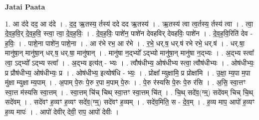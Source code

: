 \documentclass[17pt]{extarticle}
\begin{document}
\textbf{Jatai Paata} \newline

1. आ द॑दे दद॒ आ द॑दे । . द॒द॒ ऋ॒तस्य॒ र्तस्य॑ ददे दद ऋ॒तस्य॑ । . ऋ॒तस्य॑ त्वा त्व॒र्तस्य॒ र्तस्य॑ त्वा । . त्वा॒ दे॒व॒ह॒वि॒र् दे॒व॒ह॒वि॒ स्त्वा॒ त्वा॒ दे॒व॒ह॒विः॒ । . दे॒व॒ह॒विः॒ पाशे॑न॒ पाशे॑न देवहविर् देवहविः॒ पाशे॑न । . दे॒व॒ह॒वि॒रिति॑ देव - ह॒विः॒ । . पाशे॒ना पाशे॑न॒ पाशे॒ना । . आ र॑भे रभ॒ आ र॑भे । . र॒भे॒ धर्.ष॒ धर्.ष॑ रभे रभे॒ धर्.ष॑ । . धर्.षा॒ मानु॑षा॒न् मानु॑षा॒न् धर्.ष॒ धर्.षा॒ मानु॑षान् । . मानु॑षा न॒द्भ्यो᳚ ऽद्भ्यो मानु॑षा॒न् मानु॑षा न॒द्भ्यः । . अ॒द्भ्य स्त्वा᳚ त्वा॒ ऽद्भ्यो᳚ ऽद्भ्य स्त्वा᳚ । . अ॒द्भ्य इत्य॑त् - भ्यः । . त्वौष॑धीभ्य॒ ओष॑धीभ्य स्त्वा॒ त्वौष॑धीभ्यः । . ओष॑धीभ्यः॒ प्र प्रौष॑धीभ्य॒ ओष॑धीभ्यः॒ प्र । . ओष॑धीभ्य॒ इत्योष॑धि - भ्यः॒ । . प्रोक्षा᳚ म्युक्षामि॒ प्र प्रोक्षा॑मि । . उ॒क्षा॒ म्य॒पा म॒पा मु॑क्षा म्युक्षा म्य॒पाम् । . अ॒पाम् पे॒रुः पे॒रु र॒पा म॒पाम् पे॒रुः । . पे॒रु र॑स्यसि पे॒रुः पे॒रु र॑सि । . अ॒सि॒ स्वा॒त्तꣳ स्वा॒त्त म॑स्यसि स्वा॒त्तम् । . स्वा॒त्तम् चि॑च् चिथ् स्वा॒त्तꣳ स्वा॒त्तम् चि॑त् । . चि॒थ् सदे॑व॒(ग्म्॒) सदे॑वम् चिच् चि॒थ् सदे॑वम् । . सदे॑वꣳ ह॒व्यꣳ ह॒व्यꣳ सदे॑व॒(ग्म्॒) सदे॑वꣳ ह॒व्यम् । . सदे॑व॒मिति॒ स - दे॒व॒म् । . ह॒व्य माप॒ आपो॑ ह॒व्यꣳ ह॒व्य मापः॑ । . आपो॑ देवीर् देवी॒ राप॒ आपो॑ देवीः । \newline
\end{document}
